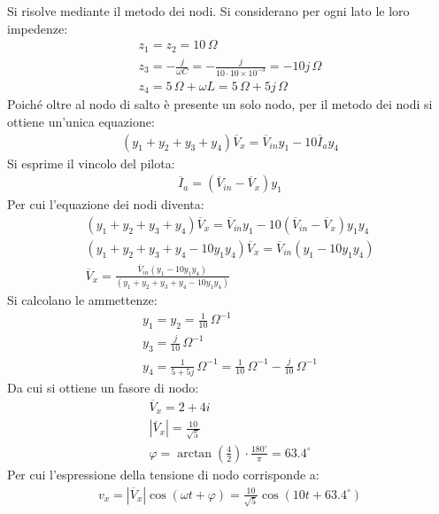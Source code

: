 \documentclass{article}
\begin{document}
Si risolve mediante il metodo dei nodi. Si considerano per ogni lato le loro impedenze:
\begin{gather*}
    z_1=z_2=10\,\Omega\\
    z_3=\displaystyle-\frac{j}{\omega C}=-\frac{j}{10\cdot 10\times10^{-3}}=-10j\,\Omega\\
    z_4=5\,\Omega+\omega L=5\,\Omega+5j\,\Omega
\end{gather*}
Poiché oltre al nodo di salto è presente un solo nodo, per il metodo dei nodi si ottiene un'unica equazione:
\begin{gather*}
    (y_1+y_2+y_3+y_4)\overline{V}_x=\overline{V}_{in}y_1-10\overline{I}_ay_4
\end{gather*}
Si esprime il vincolo del pilota:
\begin{gather*}
    \overline{I}_a=(\overline{V}_{in}-\overline{V}_x)y_1
\end{gather*}
Per cui l'equazione dei nodi diventa:
\begin{gather*}
    (y_1+y_2+y_3+y_4)\overline{V}_x=\overline{V}_{in}y_1-10(\overline{V}_{in}-\overline{V}_x)y_1y_4\\
    (y_1+y_2+y_3+y_4-10y_1y_4)\overline{V}_x=\overline{V}_{in}(y_1-10y_1y_4)\\
    \overline{V}_{x}=\displaystyle\frac{\overline{V}_{in}(y_1-10y_1y_4)}{(y_1+y_2+y_3+y_4-10y_1y_4)}
\end{gather*}
Si calcolano le ammettenze:
\begin{gather*}
    y_1=y_2=\displaystyle\frac{1}{10}\,\Omega^{-1}\\
    y_3=\displaystyle\frac{j}{10}\,\Omega^{-1}\\
    y_4=\displaystyle\frac{1}{5+5j}\,\Omega^{-1}=\frac{1}{10}\,\Omega^{-1}-\frac{j}{10}\,\Omega^{-1}
\end{gather*}
Da cui si ottiene un fasore di nodo:
\begin{gather*}
    \overline{V}_x=2+4i\\
    |\overline{V}_x|=\displaystyle\frac{10}{\sqrt{5}}\\
    \varphi=\arctan\left(\displaystyle\frac{4}{2}\right)\cdot\frac{180^{\circ}}{\pi}=63.4^{\circ}
\end{gather*}
Per cui l'espressione della tensione di nodo corrisponde a:
\begin{gather}
    v_x=|\overline{V}_x|\cos(\omega t+\varphi)=\displaystyle\frac{10}{\sqrt{5}}\cos(10t+63.4^{\circ})
\end{gather}

\clearpage
\end{document}
